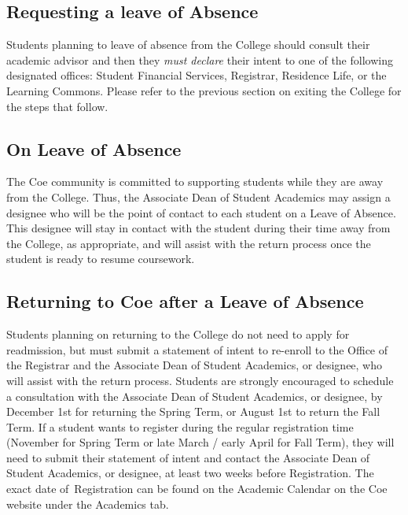 \documentclass[
  letterpaper,
]{scrbook}
\begin{document}
\subsection{Requesting a leave of
Absence}\label{requesting-a-leave-of-absence}

Students planning to leave of absence from the College should consult
their academic advisor and then they \emph{must declare} their intent to
one of the following designated offices: Student Financial Services,
Registrar, Residence Life, or the Learning Commons. Please refer to the
previous section on exiting the College for the steps that follow.~

\subsection{On Leave of Absence}\label{on-leave-of-absence}

The Coe community is committed to supporting students while they are
away from the College. Thus, the Associate Dean of Student Academics may
assign a designee who will be the point of contact to each student on a
Leave of Absence. This designee will stay in contact with the student
during their time away from the College, as appropriate, and will assist
with the return process once the student is ready to resume coursework.~

\subsection{Returning to Coe after a Leave of
Absence}\label{returning-to-coe-after-a-leave-of-absence}

Students planning on returning to the College do not need to apply for
readmission, but must submit a statement of intent to re-enroll to the
Office of the Registrar and the Associate Dean of Student Academics, or
designee, who will assist with the return process. Students are strongly
encouraged to schedule a consultation with the Associate Dean of Student
Academics, or designee, by December 1st for returning the Spring Term,
or August 1st to return the Fall Term. If a student wants to register
during the regular registration time (November for Spring Term or late
March / early April for Fall Term), they will need to submit their
statement of intent and contact the Associate Dean of Student Academics,
or designee, at least two weeks before Registration. The exact date
of~Registration can be found on the Academic Calendar on the Coe website
under the Academics tab.~
\end{document}
